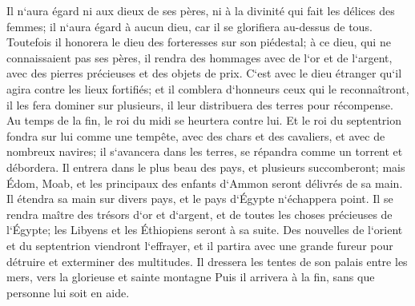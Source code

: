\verse Il n`aura égard ni aux dieux de ses pères, ni à la divinité qui fait les délices des femmes; il n`aura égard à aucun dieu, car il se glorifiera au-dessus de tous. 
\verse Toutefois il honorera le dieu des forteresses sur son piédestal; à ce dieu, qui ne connaissaient pas ses pères, il rendra des hommages avec de l`or et de l`argent, avec des pierres précieuses et des objets de prix. 
\verse C`est avec le dieu étranger qu`il agira contre les lieux fortifiés; et il comblera d`honneurs ceux qui le reconnaîtront, il les fera dominer sur plusieurs, il leur distribuera des terres pour récompense. 
\verse Au temps de la fin, le roi du midi se heurtera contre lui. Et le roi du septentrion fondra sur lui comme une tempête, avec des chars et des cavaliers, et avec de nombreux navires; il s`avancera dans les terres, se répandra comme un torrent et débordera. 
\verse Il entrera dans le plus beau des pays, et plusieurs succomberont; mais Édom, Moab, et les principaux des enfants d`Ammon seront délivrés de sa main. 
\verse Il étendra sa main sur divers pays, et le pays d`Égypte n`échappera point. 
\verse Il se rendra maître des trésors d`or et d`argent, et de toutes les choses précieuses de l`Égypte; les Libyens et les Éthiopiens seront à sa suite. 
\verse Des nouvelles de l`orient et du septentrion viendront l`effrayer, et il partira avec une grande fureur pour détruire et exterminer des multitudes. 
\verse Il dressera les tentes de son palais entre les mers, vers la glorieuse et sainte montagne Puis il arrivera à la fin, sans que personne lui soit en aide. 

